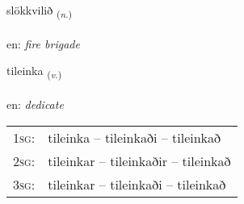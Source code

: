 \documentclass[frontgrid, backgrid]{flacards}\usepackage[]{graphicx}\usepackage[]{xcolor}
\begin{document}
\renewcommand{\blhead}{\vskip5pt {\small\bfseries\footnotesize Nafnorð | Noun }}
\renewcommand{\bcfoot}{\vskip5pt \hspace{2pt}{\small\bfseries\footnotesize 3K}}


{slökkvilið \small{\textsubscript{(\textit{n.})}} \\[1ex] %
\textphonetic{[stlœhkvɪlɪð]} \\
en: \emph{fire brigade} \\  [2ex]
\renewcommand*{\arraystretch}{0.8}
}

\renewcommand{\flhead}{\vskip5pt \fboxsep=0pt {\small\bfseries\footnotesize Sagnorð | Verb}}
\renewcommand{\fcfoot}{\vskip5pt \fboxsep=0pt \hspace{2pt}{\small\bfseries\footnotesize 3K}}

\renewcommand{\blhead}{\vskip5pt {\small\bfseries\footnotesize Sagnorð | Verb }}
\renewcommand{\bcfoot}{\vskip5pt \hspace{2pt}{\small\bfseries\footnotesize 3K}}


{tileinka \small{\textsubscript{(\textit{v.})}} \\[1ex] %
\textphonetic{[tʰɪːleiŋ̥ka]} \\
en: \emph{dedicate} \\  [2ex]
\renewcommand*{\arraystretch}{0.8}
\begin{tabular}{p{1cm}l}
\textsc{1sg}: & tileinka -- tileinkaði -- tileinkað \\ 
\textsc{2sg}: & tileinkar -- tileinkaðir -- tileinkað \\ 
\textsc{3sg}: & tileinkar -- tileinkaði -- tileinkað \\ 
\end{tabular}
}
\end{document}
